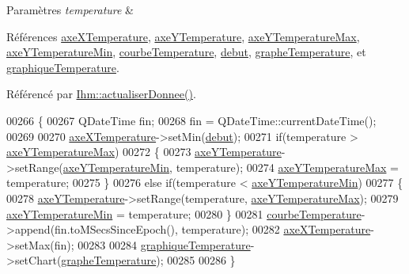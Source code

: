 \begin{DoxyParams}{Paramètres}
{\em temperature} & \\
\hline
\end{DoxyParams}


Références \hyperlink{class_graphique_a83ef0cdf381f66a6202022b8545bfb1c}{axe\+X\+Temperature}, \hyperlink{class_graphique_a3df7eeca8d7dba5f528f65d89883736f}{axe\+Y\+Temperature}, \hyperlink{class_graphique_a6aac1bb5ad9a78cb91ca64359e7da307}{axe\+Y\+Temperature\+Max}, \hyperlink{class_graphique_ad0971f340d49a40c14376a0e0a985f81}{axe\+Y\+Temperature\+Min}, \hyperlink{class_graphique_a6c2f8ef3364123ad300de74db529bd9b}{courbe\+Temperature}, \hyperlink{class_graphique_a468d57ae7b14b46558cf25629cced7b6}{debut}, \hyperlink{class_graphique_ad2fe81a972ee10a20a56300a87a78f24}{graphe\+Temperature}, et \hyperlink{class_graphique_a485cc4a65014e812b9e4aa9ee3ea9ca4}{graphique\+Temperature}.



Référencé par \hyperlink{class_ihm_a7c0a160f30e11a4f8d56b174e07566fe}{Ihm\+::actualiser\+Donnee()}.


\begin{DoxyCode}
00266 \{
00267     QDateTime fin;
00268     fin = QDateTime::currentDateTime();
00269 
00270     \hyperlink{class_graphique_a83ef0cdf381f66a6202022b8545bfb1c}{axeXTemperature}->setMin(\hyperlink{class_graphique_a468d57ae7b14b46558cf25629cced7b6}{debut});
00271     \textcolor{keywordflow}{if}(temperature > \hyperlink{class_graphique_a6aac1bb5ad9a78cb91ca64359e7da307}{axeYTemperatureMax})
00272     \{
00273         \hyperlink{class_graphique_a3df7eeca8d7dba5f528f65d89883736f}{axeYTemperature}->setRange(\hyperlink{class_graphique_ad0971f340d49a40c14376a0e0a985f81}{axeYTemperatureMin}, temperature);
00274         \hyperlink{class_graphique_a6aac1bb5ad9a78cb91ca64359e7da307}{axeYTemperatureMax} = temperature;
00275     \}
00276     \textcolor{keywordflow}{else} \textcolor{keywordflow}{if}(temperature < \hyperlink{class_graphique_ad0971f340d49a40c14376a0e0a985f81}{axeYTemperatureMin})
00277     \{
00278         \hyperlink{class_graphique_a3df7eeca8d7dba5f528f65d89883736f}{axeYTemperature}->setRange(temperature, \hyperlink{class_graphique_a6aac1bb5ad9a78cb91ca64359e7da307}{axeYTemperatureMax});
00279         \hyperlink{class_graphique_ad0971f340d49a40c14376a0e0a985f81}{axeYTemperatureMin} = temperature;
00280     \}
00281     \hyperlink{class_graphique_a6c2f8ef3364123ad300de74db529bd9b}{courbeTemperature}->append(fin.toMSecsSinceEpoch(), temperature);
00282     \hyperlink{class_graphique_a83ef0cdf381f66a6202022b8545bfb1c}{axeXTemperature}->setMax(fin);
00283 
00284     \hyperlink{class_graphique_a485cc4a65014e812b9e4aa9ee3ea9ca4}{graphiqueTemperature}->setChart(\hyperlink{class_graphique_ad2fe81a972ee10a20a56300a87a78f24}{grapheTemperature});
00285 
00286 \}
\end{DoxyCode}
